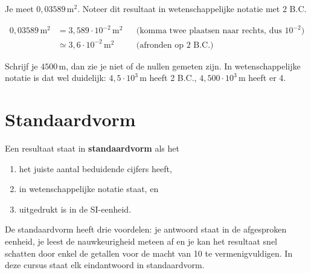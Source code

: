 \documentclass{ximera}
\begin{document}
\begin{example}[foldable=true,title={Voorbeeld: afronden en noteren in wetenschappelijke notatie}]\nl
    Je meet $0{,}03589 \, \mathrm{m}^{2}$. Noteer dit resultaat in wetenschappelijke notatie met 2 B.C.

    \begin{solution}\nl
        \begin{align*}
            0{,}03589 \, \mathrm{m}^{2} &= 3{,}589 \cdot 10^{-2} \, \mathrm{m}^{2} && \text{(komma twee plaatsen naar rechts, dus $10^{-2}$)}\\
            &\simeq \boxed{3{,}6 \cdot 10^{-2} \, \mathrm{m}^{2}} && \text{(afronden op 2 B.C.)}
        \end{align*}
    \end{solution}
\end{example}

\begin{remark}[title={Nauwkeurigheid tonen}]\nl
    Schrijf je $4500 \, \mathrm{m}$, dan zie je niet of de nullen gemeten zijn. In wetenschappelijke notatie is dat wel duidelijk: $4{,}5 \cdot 10^{3} \, \mathrm{m}$ heeft 2 B.C., $4{,}500 \cdot 10^{3} \, \mathrm{m}$ heeft er 4.
\end{remark}

\section{Standaardvorm}\label{sec:standaardvorm}
\begin{definition}[title={Standaardvorm}]\nl
    Een resultaat staat in \textbf{standaardvorm} als het
    \begin{enumerate}
        \item het juiste aantal beduidende cijfers heeft,
        \item in wetenschappelijke notatie staat, en
        \item uitgedrukt is in de SI-eenheid.
    \end{enumerate}
\end{definition}

De standaardvorm heeft drie voordelen: je antwoord staat in de afgesproken eenheid, je leest de nauwkeurigheid meteen af en je kan het resultaat snel schatten door enkel de getallen voor de macht van 10 te vermenigvuldigen. In deze cursus staat elk eindantwoord in standaardvorm.
\end{document}
